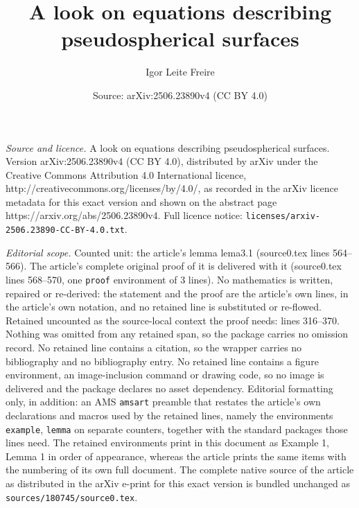 \documentclass[10pt,a4paper]{amsart}
\title{A look on equations describing pseudospherical surfaces}
\author{Igor Leite Freire}
\date{Source: arXiv:2506.23890v4 (CC BY 4.0)}
\begin{document}
\maketitle

\noindent\emph{Source and licence.} A look on equations describing pseudospherical surfaces. Version arXiv:2506.23890v4 (CC BY 4.0), distributed by arXiv under the Creative Commons Attribution 4.0 International licence, http://creativecommons.org/licenses/by/4.0/, as recorded in the arXiv licence metadata for this exact version and shown on the abstract page https://arxiv.org/abs/2506.23890v4. Full licence notice: \texttt{licenses/arxiv-2506.23890-CC-BY-4.0.txt}.\par\smallskip

\noindent\textit{Editorial scope.} Counted unit: the article's lemma lema3.1 (source0.tex lines 564--566). The article's complete original proof of it is delivered with it (source0.tex lines 568--570, one \texttt{proof} environment of 3 lines). No mathematics is written, repaired or re-derived: the statement and the proof are the article's own lines, in the article's own notation, and no retained line is substituted or re-flowed.  Retained uncounted as the source-local context the proof needs: lines 316--370.  Nothing was omitted from any retained span, so the package carries no omission record.  No retained line contains a citation, so the wrapper carries no bibliography and no bibliography entry.  No retained line contains a figure environment, an image-inclusion command or drawing code, so no image is delivered and the package declares no asset dependency.  Editorial formatting only, in addition: an AMS \texttt{amsart} preamble that restates the article's own declarations and macros used by the retained lines, namely the environments \texttt{example}, \texttt{lemma} on separate counters, together with the standard packages those lines need.  The retained environments print in this document as Example 1, Lemma 1 in order of appearance, whereas the article prints the same items with the numbering of its own full document.  The complete native source of the article as distributed in the arXiv e-print for this exact version is bundled unchanged as \texttt{sources/180745/source0.tex}.
\end{document}
